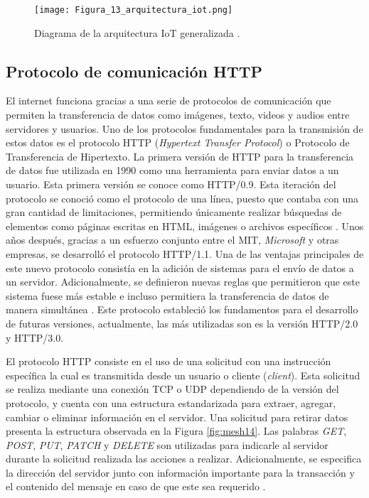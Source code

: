 \begin{figure}[H]
	\centering
	\texttt{[image: Figura\_13\_arquitectura\_iot.png]}
	\caption{Diagrama de la arquitectura IoT generalizada \cite{grizhnevich_iot_2018}.}
	\label{fig:mesh13}
\end{figure}

\subsection{Protocolo de comunicación HTTP}
El internet funciona gracias a una serie de protocolos de comunicación que permiten la transferencia de datos como imágenes, texto, videos y audios entre servidores y usuarios. Uno de los protocolos fundamentales para la transmisión de estos datos es el protocolo HTTP (\textit{Hypertext Transfer Protocol}) o Protocolo de Transferencia de Hipertexto. La primera versión de HTTP para la transferencia de datos fue utilizada en 1990 como una herramienta para enviar datos a un usuario. Esta primera versión se conoce como HTTP/0.9. Esta iteración del protocolo se conoció como el protocolo de una línea, puesto que contaba con una gran cantidad de limitaciones, permitiendo únicamente realizar búsquedas de elementos como páginas escritas en HTML, imágenes o archivos específicos \cite{Evolution_http_Mozilla_2024}. Unos años después, gracias a un esfuerzo conjunto entre el MIT, \textit{Microsoft} y otras empresas, se desarrolló el protocolo HTTP/1.1. Una de las ventajas principales de este nuevo protocolo consistía en la adición de sistemas para el envío de datos a un servidor. Adicionalmente, se definieron nuevas reglas que permitieron que este sistema fuese más estable e incluso permitiera la transferencia de datos de manera simultánea \cite{fielding_hypertext_1999}. Este protocolo estableció los fundamentos para el desarrollo de futuras versiones, actualmente, las más utilizadas son  es la versión HTTP/2.0 y HTTP/3.0.

El protocolo HTTP consiste en el uso de una solicitud con una instrucción específica la cual es transmitida desde un usuario o cliente (\textit{client}). Esta solicitud se realiza mediante una conexión TCP o UDP dependiendo de la versión del protocolo, y cuenta con una estructura estandarizada para extraer, agregar, cambiar o eliminar información en el servidor. Una solicitud para retirar datos presenta la estructura observada en la Figura \ref{fig:mesh14}. Las palabras \textit{GET}, \textit{POST}, \textit{PUT}, \textit{PATCH} y \textit{DELETE} son utilizadas para indicarle al servidor durante la solicitud realizada las acciones a realizar. Adicionalmente, se especifica la dirección del servidor junto con información importante para la transacción y el contenido del mensaje en caso de que este sea requerido \cite{overview_http_mozilla_2024}.

